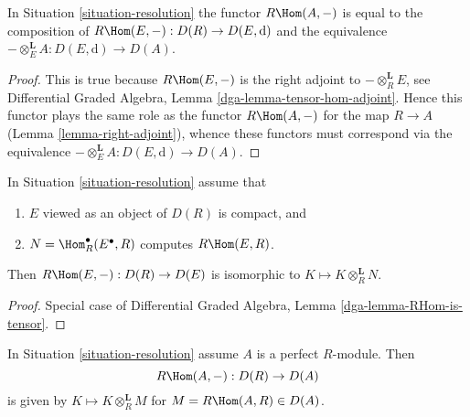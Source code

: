 \begin{lemma}
\label{lemma-RHom-dga}
In Situation \ref{situation-resolution} the functor $R\Hom(A, -)$
is equal to the composition of
$R\Hom(E, -) : D(R) \to D(E, \text{d})$
and the equivalence $- \otimes^\mathbf{L}_E A : D(E, \text{d}) \to D(A)$.
\end{lemma}

\begin{proof}
This is true because $R\Hom(E, -)$ is the right adjoint
to $- \otimes^\mathbf{L}_R E$, see
Differential Graded Algebra, Lemma \ref{dga-lemma-tensor-hom-adjoint}.
Hence this functor plays the same role as the functor
$R\Hom(A, -)$ for the map $R \to A$ (Lemma \ref{lemma-right-adjoint}),
whence these functors must correspond via the equivalence
$- \otimes^\mathbf{L}_E A : D(E, \text{d}) \to D(A)$.
\end{proof}

\begin{lemma}
\label{lemma-RHom-is-tensor}
In Situation \ref{situation-resolution} assume that
\begin{enumerate}
\item $E$ viewed as an object of $D(R)$ is compact, and
\item $N = \Hom^\bullet_R(E^\bullet, R)$ computes $R\Hom(E, R)$.
\end{enumerate}
Then $R\Hom(E, -) : D(R) \to D(E)$ is isomorphic to
$K \mapsto K \otimes_R^\mathbf{L} N$.
\end{lemma}

\begin{proof}
Special case of Differential Graded Algebra, Lemma
\ref{dga-lemma-RHom-is-tensor}.
\end{proof}

\begin{lemma}
\label{lemma-RHom-is-tensor-special}
In Situation \ref{situation-resolution} assume $A$ is a perfect $R$-module.
Then
$$
R\Hom(A, -) : D(R) \to D(A)
$$
is given by $K \mapsto K \otimes_R^\mathbf{L} M$ for $M = R\Hom(A, R) \in D(A)$.
\end{lemma}

